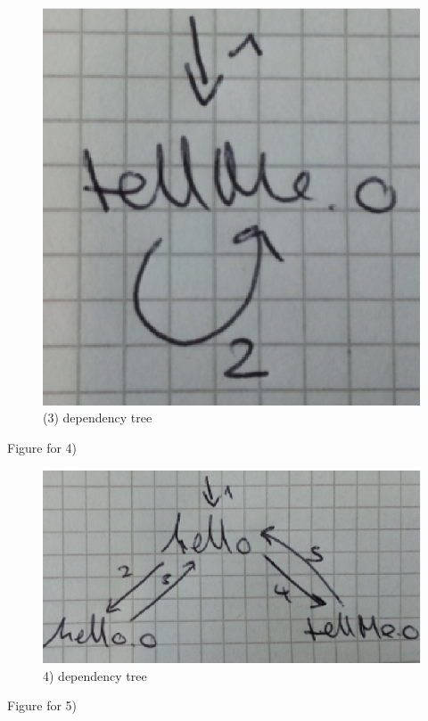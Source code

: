 \documentclass[12pt]{article}
\begin{document}
\begin{figure}[!htb]
\centering
\includegraphics[scale=0.5]{make_dep_q3_2.eps} 
\caption{(3) dependency tree}
\end{figure}

Figure for 4)

\begin{figure}
\centering
\includegraphics[scale=0.5]{make_dep_q3_4.eps} 
\caption{4) dependency tree}
\end{figure}


Figure for 5)
\end{document}
